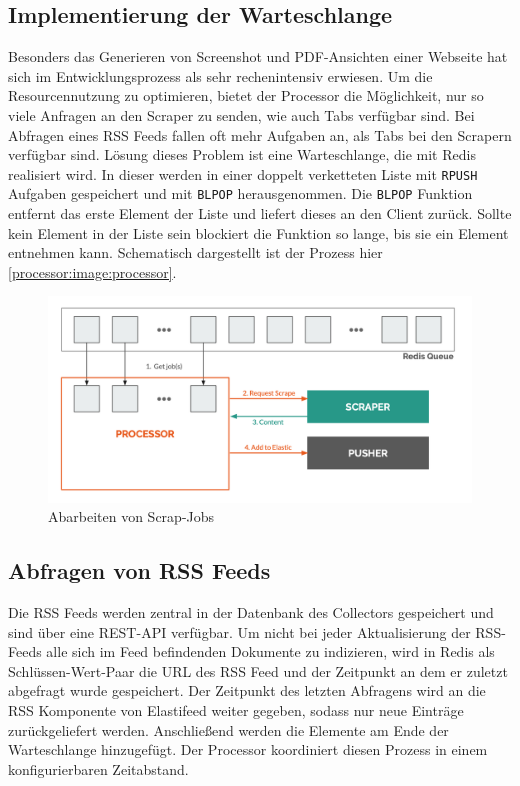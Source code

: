 \subsection{Implementierung der Warteschlange}

Besonders das Generieren von Screenshot und PDF-Ansichten einer Webseite hat sich im Entwicklungsprozess als sehr rechenintensiv erwiesen.
Um die Resourcennutzung zu optimieren, bietet der Processor die Möglichkeit, nur so viele Anfragen an den Scraper zu senden, wie auch Tabs verfügbar sind.
Bei Abfragen eines RSS Feeds fallen oft mehr Aufgaben an, als Tabs bei den Scrapern verfügbar sind.
Lösung dieses Problem ist eine Warteschlange, die mit Redis \cite{redis} realisiert wird.
In dieser werden in einer doppelt verketteten Liste mit \texttt{RPUSH} Aufgaben gespeichert und mit \texttt{BLPOP} herausgenommen.
Die \texttt{BLPOP} Funktion entfernt das erste Element der Liste und liefert dieses an den Client zurück.
Sollte kein Element in der Liste sein blockiert die Funktion so lange, bis sie ein Element entnehmen kann.
Schematisch dargestellt ist der Prozess hier \autoref{processor:image:processor}.

\begin{figure}[t]
  \centering
  \includegraphics[width=\linewidth]{images/processor.png}
  \caption{Abarbeiten von Scrap-Jobs}
  \label{processor:image:processor}
\end{figure}


\subsection{Abfragen von RSS Feeds}
Die RSS Feeds werden zentral in der Datenbank des Collectors gespeichert und sind über eine REST-API verfügbar.
Um nicht bei jeder Aktualisierung der RSS-Feeds alle sich im Feed befindenden Dokumente zu indizieren, wird in Redis als Schlüssen-Wert-Paar die URL des RSS Feed und der Zeitpunkt an dem er zuletzt abgefragt wurde gespeichert.
Der Zeitpunkt des letzten Abfragens wird an die RSS Komponente von Elastifeed weiter gegeben, sodass nur neue Einträge zurückgeliefert werden.
Anschließend werden die Elemente am Ende der Warteschlange hinzugefügt.
Der Processor koordiniert diesen Prozess in einem konfigurierbaren Zeitabstand.

